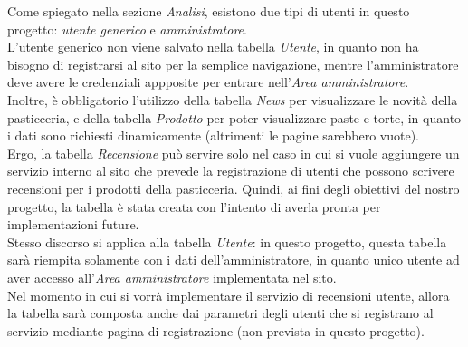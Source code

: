 Come spiegato nella sezione \emph{Analisi}, esistono due tipi di utenti in questo progetto: \emph{utente generico} e \emph{amministratore}.\\ L'utente generico non viene salvato nella 
tabella \emph{Utente}, in quanto non ha bisogno di registrarsi al sito per la semplice navigazione, mentre l'amministratore deve avere le credenziali appposite per entrare 
nell'\emph{Area amministratore}.\\
Inoltre, è obbligatorio l'utilizzo della tabella \emph{News} per visualizzare le novità della pasticceria, e della tabella \emph{Prodotto} per poter visualizzare paste e torte, in quanto 
i dati sono richiesti dinamicamente (altrimenti le pagine sarebbero vuote).\\
Ergo, la tabella \emph{Recensione} può servire solo nel caso in cui si vuole aggiungere un servizio interno al sito che prevede la registrazione di utenti che possono scrivere recensioni 
per i prodotti della pasticceria. Quindi, ai fini degli obiettivi del nostro progetto, la tabella è stata creata con l'intento di averla pronta per implementazioni future.\\
Stesso discorso si applica alla tabella \emph{Utente}: in questo progetto, questa tabella sarà riempita solamente con i dati dell'amministratore, in quanto unico utente ad aver accesso 
all'\emph{Area amministratore} implementata nel sito.\\
Nel momento in cui si vorrà implementare il servizio di recensioni utente, allora la tabella sarà composta anche dai parametri degli utenti che si registrano al servizio mediante pagina 
di registrazione (non prevista in questo progetto).
